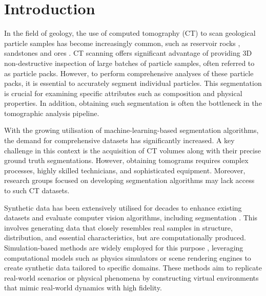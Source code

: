 \documentclass[preprint,12pt]{elsarticle}
\begin{document}

\section{Introduction} \label{sec:introduction}
In the field of geology, the use of computed tomography (CT) to scan geological particle samples has become increasingly common, such as reservoir rocks \cite{VANGEET200025}, sandstones \cite{cnudde20123d} and ores \cite{warlo2021multi}.
CT scanning offers significant advantage of providing 3D non-destructive inspection of large batches of particle samples, often referred to as particle packs.
However, to perform comprehensive analyses of these particle packs, it is essential to accurately segment individual particles. 
This segmentation is crucial for examining specific attributes such as composition and physical properties.
In addition, obtaining such segmentation is often the bottleneck in the tomographic analysis pipeline.
\par
With the growing utilisation of machine-learning-based segmentation algorithms, the demand for comprehensive datasets has significantly increased. 
A key challenge in this context is the acquisition of CT volumes along with their precise ground truth segmentations. 
However, obtaining tomograms requires complex processes, highly skilled technicians, and sophisticated equipment. %
Moreover, research groups focused on developing segmentation algorithms may lack access to such CT datasets. 
\par
Synthetic data has been extensively utilised for decades to enhance existing datasets and evaluate computer vision algorithms, including segmentation \citep{richter2016playingdatagroundtruth}. 
This involves generating data that closely resembles real samples in structure, distribution, and essential characteristics, but are computationally produced.
Simulation-based methods are widely employed for this purpose \citep{demelo2022nextgeneration}, leveraging computational models such as physics simulators or scene rendering engines to create synthetic data tailored to specific domains. 
These methods aim to replicate real-world scenarios or physical phenomena by constructing virtual environments that mimic real-world dynamics with high fidelity.
\end{document}
